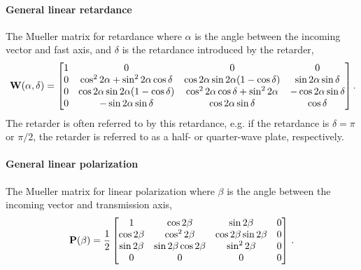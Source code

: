 \paragraph{General linear retardance}
The Mueller matrix for retardance where $\alpha$ is the angle between the incoming vector and fast axis, and $\delta$ is the retardance introduced by the retarder,
\begin{equation}
    \matr{W}(\alpha, \delta) =
    \begin{bmatrix}
        1 & 0                                                 & 0                                                 & 0                          \\
        0 & \cos^{2} 2 \alpha + \sin^{2} 2 \alpha \cos \delta & \cos 2 \alpha \sin 2 \alpha  (1 - \cos \delta)    & \sin 2 \alpha \sin \delta  \\
        0 & \cos 2 \alpha \sin 2 \alpha  (1 - \cos \delta)    & \cos^{2} 2 \alpha \cos \delta + \sin^{2} 2 \alpha & -\cos 2 \alpha \sin \delta \\
        0 & -\sin 2 \alpha \sin \delta                        & \cos 2 \alpha \sin \delta                         & \cos \delta                \\
    \end{bmatrix}\rlap{.}\label{matrix:retarder}
\end{equation}
The retarder is often referred to by this retardance, e.g. if the retardance is $\delta = \pi$ or $\pi / 2$, the retarder is referred to as a half- or quarter-wave plate, respectively.

\paragraph{General linear polarization}
The Mueller matrix for linear polarization where $\beta$ is the angle between the incoming vector and transmission axis,
\begin{equation}
    \mathbf{P}(\beta) = \frac{1}{2}
    \begin{bmatrix}
        1            & \cos 2 \beta              & \sin 2 \beta              & 0 \\
        \cos 2 \beta & \cos^{2} 2 \beta          & \cos 2 \beta \sin 2 \beta & 0 \\
        \sin 2 \beta & \sin 2 \beta \cos 2 \beta & \sin^{2} 2 \beta          & 0 \\
        0            & 0                         & 0                         & 0 \\
    \end{bmatrix}\,.\label{matrix:polarizer}
\end{equation}

